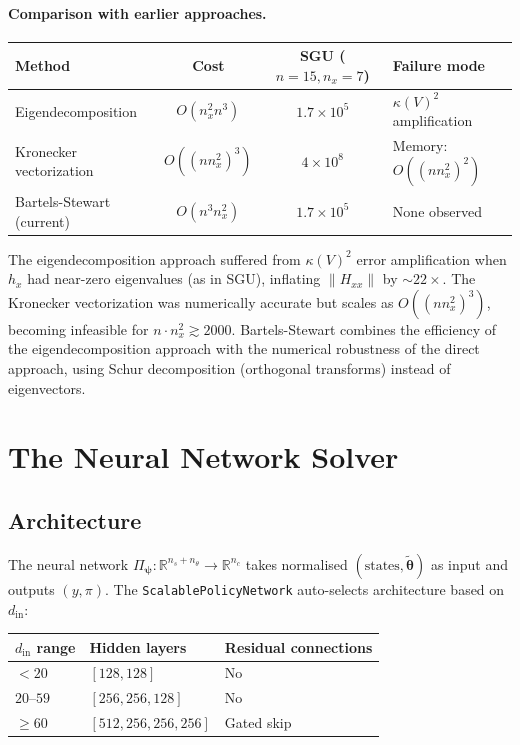 \documentclass[11pt,a4paper]{article}
\theoremstyle{definition}
\newcommand{\R}{\mathbb{R}}
\newcommand{\btheta}{\boldsymbol{\theta}}
\newcommand{\bpsi}{\boldsymbol{\psi}}
\newcommand{\code}[1]{\texttt{\color{codecolor}#1}}
\begin{document}
	\paragraph{Comparison with earlier approaches.}

	\begin{center}
	\begin{tabular}{lccl}
		\toprule
		Method & Cost & SGU ($n{=}15, n_x{=}7$) & Failure mode \\
		\midrule
		Eigendecomposition & $O(n_x^2 n^3)$ & $1.7 \times 10^5$ & $\kappa(V)^2$ amplification \\
		Kronecker vectorization & $O((n n_x^2)^3)$ & $4 \times 10^8$ & Memory: $O((n n_x^2)^2)$ \\
		Bartels-Stewart (current) & $O(n^3 n_x^2)$ & $1.7 \times 10^5$ & None observed \\
		\bottomrule
	\end{tabular}
	\end{center}

	The eigendecomposition approach suffered from $\kappa(V)^2$ error amplification when $h_x$ had near-zero eigenvalues (as in SGU), inflating $\|H_{xx}\|$ by $\sim 22\times$.
	The Kronecker vectorization was numerically accurate but scales as $O((n n_x^2)^3)$, becoming infeasible for $n \cdot n_x^2 \gtrsim 2000$.
	Bartels-Stewart combines the efficiency of the eigendecomposition approach with the numerical robustness of the direct approach, using Schur decomposition (orthogonal transforms) instead of eigenvectors.

	\section{The Neural Network Solver}
	\label{sec:neural_solver}
	
	\subsection{Architecture}
	\label{sec:nn_arch}
	
	The neural network $\Pi_{\bpsi}: \R^{n_s + n_\theta} \to \R^{n_c}$ takes normalised $(\text{states}, \tilde{\btheta})$ as input and outputs $(y, \pi)$.
	The \code{ScalablePolicyNetwork} auto-selects architecture based on $d_{\mathrm{in}}$:
	
	\begin{center}
		\begin{tabular}{lll}
			\toprule
			$d_{\mathrm{in}}$ range & Hidden layers & Residual connections \\
			\midrule
			$< 20$ & $[128, 128]$ & No \\
			$20$--$59$ & $[256, 256, 128]$ & No \\
			$\geq 60$ & $[512, 256, 256, 256]$ & Gated skip \\
			\bottomrule
		\end{tabular}
	\end{center}
	
\end{document}
